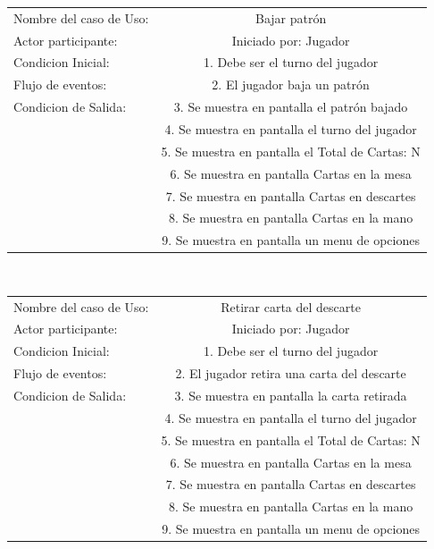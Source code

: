 \documentclass[60pt]{article}
\begin{document}
\begin{center}
    \begin{tabular}{ l | c  }
        Nombre del caso de Uso: & Bajar patrón \\
        Actor participante: & Iniciado por: Jugador \\\hline
        Condicion Inicial: & 1. Debe ser el turno del jugador    \\
        Flujo de eventos: & 2. El jugador baja un patrón \\\hline
        Condicion de Salida: & 3. Se muestra en pantalla el patrón bajado \\
        & 4. Se muestra en pantalla el turno del jugador \\
        & 5. Se muestra en pantalla el Total de Cartas: N \\
        & 6. Se muestra en pantalla Cartas en la mesa \\
        & 7. Se muestra en pantalla Cartas en descartes \\
        & 8. Se muestra en pantalla Cartas en la mano \\
        & 9. Se muestra en pantalla un menu de opciones \\ 
    \end{tabular} \\
\end{center}
\begin{center}
    \begin{tabular}{ l | c  }
        Nombre del caso de Uso: & Retirar carta del descarte \\
        Actor participante: & Iniciado por: Jugador \\\hline
        Condicion Inicial: & 1. Debe ser el turno del jugador    \\
        Flujo de eventos: & 2. El jugador retira una carta del descarte \\\hline
        Condicion de Salida: & 3. Se muestra en pantalla la carta retirada \\
        & 4. Se muestra en pantalla el turno del jugador \\
        & 5. Se muestra en pantalla el Total de Cartas: N \\
        & 6. Se muestra en pantalla Cartas en la mesa \\
        & 7. Se muestra en pantalla Cartas en descartes \\
        & 8. Se muestra en pantalla Cartas en la mano \\
        & 9. Se muestra en pantalla un menu de opciones \\ 
    \end{tabular} \\
\end{center}
\end{document}
